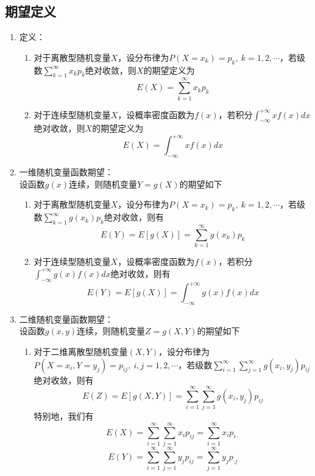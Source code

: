\documentclass[12pt,a4paper,UTF8]{book}
\begin{document}
\subsection{期望定义}
\begin{enumerate}
\item 定义：
\begin{enumerate}
\item 对于离散型随机变量$X$，设分布律为$P\left(X=x_k\right)=p_k,\ k=1,2,\cdots$，若级数$\sum\limits_{k=1}^{\infty}x_kp_k$绝对收敛，则$X$的期望定义为
\[E\left(X\right)=\sum\limits_{k=1}^{\infty}x_kp_k\]
\item 对于连续型随机变量$X$，设概率密度函数为$f\left(x\right)$，若积分$\int_{-\infty}^{+\infty}xf\left(x\right)dx$绝对收敛，则$X$的期望定义为
\[E\left(X\right)=\int_{-\infty}^{+\infty}xf\left(x\right)dx\]
\end{enumerate}
\item 一维随机变量函数期望：\\
设函数$g\left(x\right)$连续，则随机变量$Y=g\left(X\right)$的期望如下
\begin{enumerate}
\item 对于离散型随机变量$X$，设分布律为$P\left(X=x_k\right)=p_k,\ k=1,2,\cdots$，若级数$\sum\limits_{k=1}^{\infty}g\left(x_k\right)p_k$绝对收敛，则有
\[E\left(Y\right)=E\left[g\left(X\right)\right]=\sum\limits_{k=1}^{\infty}g\left(x_k\right)p_k\]
\item 对于连续型随机变量$X$，设概率密度函数为$f\left(x\right)$，若积分$\int_{-\infty}^{+\infty}g\left(x\right)f\left(x\right)dx$绝对收敛，则有
\[E\left(Y\right)=E\left[g\left(X\right)\right]=\int_{-\infty}^{+\infty}g\left(x\right)f\left(x\right)dx\]
\end{enumerate}
\item 二维随机变量函数期望：\\
设函数$g\left(x,y\right)$连续，则随机变量$Z=g\left(X,Y\right)$的期望如下
\begin{enumerate}
\item 对于二维离散型随机变量$\left(X,Y\right)$，设分布律为$P\left(X=x_i,Y=y_j\right)=p_{ij},\ i,j=1,2,\cdots$，若级数$\sum\limits_{i=1}^{\infty}\sum\limits_{j=1}^{\infty}g\left(x_i,y_j\right)p_{ij}$绝对收敛，则有
\[E\left(Z\right)=E\left[g\left(X,Y\right)\right]=\sum\limits_{i=1}^{\infty}\sum\limits_{j=1}^{\infty}g\left(x_i,y_j\right)p_{ij}\]
特别地，我们有
\[E\left(X\right)=\sum\limits_{i=1}^{\infty}\sum\limits_{j=1}^{\infty}x_ip_{ij}=\sum\limits_{i=1}^{\infty}x_ip_{i\cdot}\]
\[E\left(Y\right)=\sum\limits_{i=1}^{\infty}\sum\limits_{j=1}^{\infty}y_jp_{ij}=\sum\limits_{j=1}^{\infty}y_jp_{\cdot j}\]

\end{enumerate}
\end{enumerate}
\end{document}
